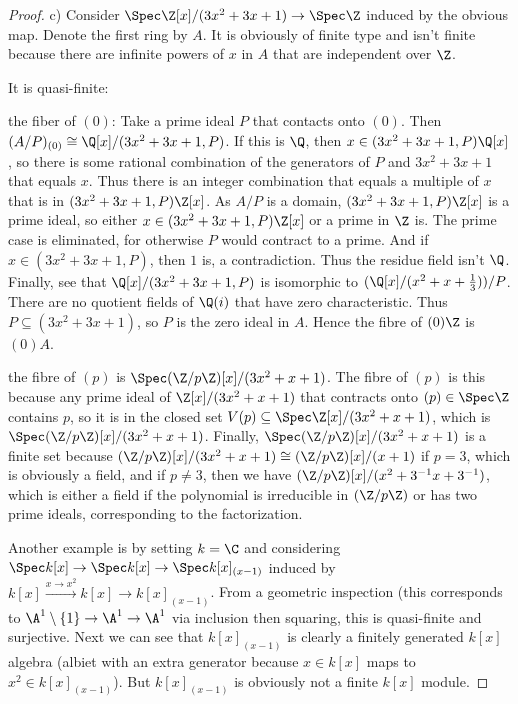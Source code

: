 \begin{proof}
	c) Consider $\Spec \Z[x] / (3x^2+3x+1) \to \Spec \Z$ induced by the obvious map.
	Denote the first ring by $A $.
	It is obviously of finite type and isn't finite because there are infinite powers of $x $ in $A$ that are independent over $\Z $.

	It is quasi-finite:

	the fiber of $(0) $: Take a prime ideal $P $ that contacts onto $(0) $.
	Then $(A / P)_{(0)} \cong \Q [x] / (3x^2+3x+1,P) $.
	If this is $\Q $, then $x\in (3x^2+3x+1,P)\Q[x]$, so there is some rational combination of the generators of $P $ and $3x^2+3x+1 $ that equals $x $.
	Thus there is an integer combination that equals a multiple of $x $ that is in $(3x^2+3x+1,P)\Z[x]$.
	As $A / P $ is a domain, $(3x^2+3x+1,P)\Z[x] $ is a prime ideal, so either $x\in (3x^2+3x+1,P)\Z[x] $ or a prime in $\Z $ is.
	The prime case is eliminated, for otherwise $P $ would contract to a prime.
	And if $x\in (3x^2+3x+1,P) $, then $1 $ is, a contradiction.
	Thus the residue field isn't $\Q $.
	Finally, see that $\Q[x] / (3x^2+3x+1,P) $ is isomorphic to $(\Q[x] / (x^2+x+\frac{1}{3})) / P $.
	There are no quotient fields of $\Q(i) $ that have zero characteristic.
	Thus $P \subseteq (3x^2+3x+1) $, so $P$ is the zero ideal in $A$.
	Hence the fibre of $(0)\Z $ is $(0)A$.

	the fibre of $(p) $ is $\Spec (\Z / p\Z)[x] / (3x^2 + x+1)$.
	The fibre of $(p) $ is this because any prime ideal of $\Z[x] / (3x^2+x+1) $ that contracts onto $(p) \in \Spec \Z $ contains $p $, so it is in the closed set $V(p) \subseteq \Spec \Z[x] / (3x^2+x+1)$, which is $\Spec (\Z / p\Z)[x] / (3x^2+x+1) $.
	Finally, $\Spec (\Z / p\Z)[x] / (3x^2+x+1) $ is a finite set because $(\Z / p\Z)[x] / (3x^2+x+1) \cong (\Z / p\Z)[x] / (x+1) $ if $p=3 $, which is obviously a field, and if $p\ne 3 $, then we have $(\Z / p\Z)[x] / (x^2+3^{-1}x+3^{-1})$, which is either a field if the polynomial is irreducible in $(\Z / p\Z) $ or has two prime ideals, corresponding to the factorization.

	Another example is by setting $k=\C $ and considering $\Spec k[x] \to \Spec k[x] \to \Spec k[x]_{(x-1)} $ induced by $k[x] \xrightarrow{x\to x^2} k[x] \to k[x]_{(x-1)} $.
	From a geometric inspection (this corresponds to $\A^1\setminus \{1\}   \to \A^1 \to \A^1  $ via inclusion then squaring, this is quasi-finite and surjective.
	Next we can see that $k[x]_{(x-1)} $ is clearly a finitely generated $k[x] $ algebra (albiet with an extra generator because $x\in k[x] $ maps to $x^2 \in k[x]_{(x-1)} $).
	But $k[x] _{(x-1)} $ is obviously not a finite $k[x] $ module.


\end{proof}
